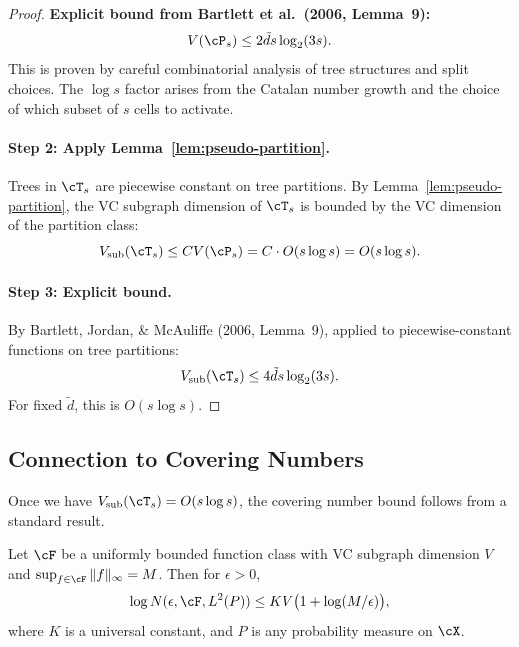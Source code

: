 \begin{proof}
\textbf{Explicit bound from Bartlett et al.\ (2006, Lemma~9):}
\[
V(\cP_s) \le 2\tilde{d} s \log_2(3s).
\]
This is proven by careful combinatorial analysis of tree structures and split choices. The $\log s$ factor arises from the Catalan number growth and the choice of which subset of $s$ cells to activate.

\paragraph{Step 2: Apply Lemma~\ref{lem:pseudo-partition}.}
Trees in $\cT_s$ are piecewise constant on tree partitions. By Lemma~\ref{lem:pseudo-partition}, the VC subgraph dimension of $\cT_s$ is bounded by the VC dimension of the partition class:
\[
V_{\text{sub}}(\cT_s) \le C V(\cP_s) = C \cdot O(s \log s) = O(s \log s).
\]

\paragraph{Step 3: Explicit bound.}
By Bartlett, Jordan, \& McAuliffe (2006, Lemma~9), applied to piecewise-constant functions on tree partitions:
\[
V_{\text{sub}}(\cT_s) \le 4\tilde{d} s \log_2(3s).
\]
For fixed $\tilde{d}$, this is $O(s \log s)$.
\end{proof}

\subsection{Connection to Covering Numbers}

Once we have $V_{\text{sub}}(\cT_s) = O(s \log s)$, the covering number bound follows from a standard result.

\begin{corollary}
\label{cor:covering-app}
Let $\cF$ be a uniformly bounded function class with VC subgraph dimension $V$ and $\sup_{f \in \cF} \|f\|_\infty = M$. Then for $\epsilon > 0$,
\[
\log N(\epsilon, \cF, L^2(P)) \le K V \bigl( 1 + \log(M/\epsilon) \bigr),
\]
where $K$ is a universal constant, and $P$ is any probability measure on $\cX$.
\end{corollary}

